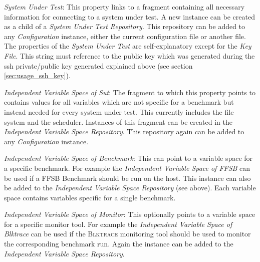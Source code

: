 \begin{itemize*}
    \item  \textit{System Under Test}: This property links to a fragment
        containing all necessary information for connecting to a system under
        test. A new instance can be created as a child of a \textit{System Under
        Test Repository}. This repository can be added to any
        \textit{Configuration} instance, either the current configuration file
        or another file. The properties of the \textit{System Under Test} are
        self-explanatory except for the \textit{Key File}. This string must
        reference to the public key which was generated during the ssh
        private/public key generated explained above (see section
        \ref{sec:usage_ssh_key}).
    \item \textit{Independent Variable Space of Sut}: The fragment to which
        this property points to contains values for all variables which are not
        specific for a benchmark but instead needed for every system under test.
        This currently includes the file system and the scheduler. Instances of
        this fragment can be created in the \textit{Independent Variable Space
        Repository}. This repository again can be added to any
        \textit{Configuration} instance.
    \item \textit{Independent Variable Space of Benchmark}: This can point to
        a variable space for a specific benchmark. For example the
        \textit{Independent Variable Space of FFSB} can be used if a FFSB
        Benchmark should be run on the host. This instance can also be added to
        the \textit{Independent Variable Space Repository} (see above). Each
        variable space contains variables specific for a single benchmark. 
    \item \textit{Independent Variable Space of Monitor}: This optionally points to a variable space for a specific monitor tool. For example
    the \textit{Independent Variable Space of Blktrace} can be used if the \textsc{Blktrace} monitoring tool should be used to
    monitor the corresponding benchmark run. Again the instance can be added to
        the \textit{Independent Variable Space Repository}.
\end{itemize*}

